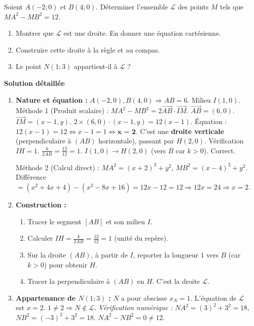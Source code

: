 \documentclass[11pt]{article}
\begin{document}
\begin{exoresolu}[Ligne de niveau $MA^2 - MB^2 = k$ — Droite perpendiculaire]
Soient $A(-2;0)$ et $B(4;0)$. Déterminer l'ensemble $\mathcal{L}$ des points $M$ tels que $MA^2 - MB^2 = 12$.
\begin{enumerate}
    \item Montrer que $\mathcal{L}$ est une droite. En donner une équation cartésienne.
    \item Construire cette droite à la règle et au compas.
    \item Le point $N(1; 3)$ appartient-il à $\mathcal{L}$ ?
\end{enumerate}
\tcblower
\textbf{Solution détaillée}
\begin{enumerate}
    \item \textbf{Nature et équation :}
    $A(-2,0), B(4,0) \Rightarrow AB = 6$. Milieu $I(1,0)$.
    Méthode 1 (Produit scalaire) :
    $MA^2 - MB^2 = 2 \overrightarrow{AB} \cdot \overrightarrow{IM}$.
    $\overrightarrow{AB} = (6, 0)$. $\overrightarrow{IM} = (x-1, y)$.
    $2 \times (6,0) \cdot (x-1, y) = 12(x-1)$.
    Équation : $12(x-1) = 12 \iff x-1 = 1 \iff \textbf{x = 2}$.
    C'est une \textbf{droite verticale} (perpendiculaire à $(AB)$ horizontale), passant par $H(2,0)$.
    Vérification $IH = 1$. $\frac{k}{2AB} = \frac{12}{12} = 1$. $I(1,0) \to H(2,0)$ (vers $B$ car $k>0$). Correct.
    
    Méthode 2 (Calcul direct) :
    $MA^2 = (x+2)^2+y^2$, $MB^2 = (x-4)^2+y^2$.
    Différence $= (x^2+4x+4) - (x^2-8x+16) = 12x - 12 = 12 \Rightarrow 12x = 24 \Rightarrow x=2$.
    
    \item \textbf{Construction :}
    \begin{enumerate}
        \item Tracer le segment $[AB]$ et son milieu $I$.
        \item Calculer $IH = \frac{k}{2AB} = \frac{12}{12} = 1$ (unité du repère).
        \item Sur la droite $(AB)$, à partir de $I$, reporter la longueur $1$ vers $B$ (car $k>0$) pour obtenir $H$.
        \item Tracer la perpendiculaire à $(AB)$ en $H$. C'est la droite $\mathcal{L}$.
    \end{enumerate}
    
    \item \textbf{Appartenance de $N(1;3)$ :}
    $N$ a pour abscisse $x_N = 1$.
    L'équation de $\mathcal{L}$ est $x = 2$.
    $1 \neq 2 \Rightarrow \textbf{$N \notin \mathcal{L}$}$.
    \emph{Vérification numérique :} $NA^2 = (3)^2+3^2=18$, $NB^2 = (-3)^2+3^2=18$. $NA^2-NB^2=0 \neq 12$.
\end{enumerate}
\end{exoresolu}
\end{document}
